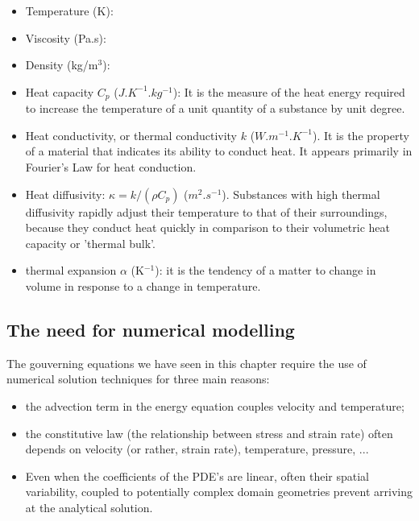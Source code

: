 \begin{itemize}
 
\item Temperature (K):
\item Viscosity (Pa.s):
\item Density (kg/m$^3$):
\item Heat capacity $C_p$ ($J.K^{-1}.kg^{-1}$): It is the measure of the heat energy required to increase the 
temperature of a unit quantity of a substance by unit degree.
\item Heat conductivity, or thermal conductivity $k$ ($W.m^{-1}.K^{-1}$). It is the property of a material that indicates its ability to conduct     heat. It appears primarily in Fourier's Law for heat conduction.
\item Heat diffusivity: $\kappa=k/(\rho C_p)$ ($m^2.s^{-1}$). Substances with high thermal diffusivity rapidly adjust their temperature to that of their surroundings, because they 
conduct heat quickly in comparison to their volumetric heat capacity or 'thermal bulk'.
\item thermal expansion $\alpha$ (K$^{-1}$): it is the tendency of a matter to change in volume in response to a change in
temperature.

\end{itemize}




\newpage
\subsection{The need for numerical modelling}

The gouverning equations we have seen in this chapter require the use 
of numerical solution techniques for three main reasons:
\begin{itemize}
\item the advection term in the energy equation couples velocity and temperature;
\item the constitutive law (the relationship between stress and strain rate) 
often depends on velocity (or rather, strain rate), temperature, pressure, ...
\item Even when the coefficients of the PDE's are linear, often their spatial
variability, coupled to potentially complex domain geometries prevent 
arriving at the analytical solution.
\end{itemize}




